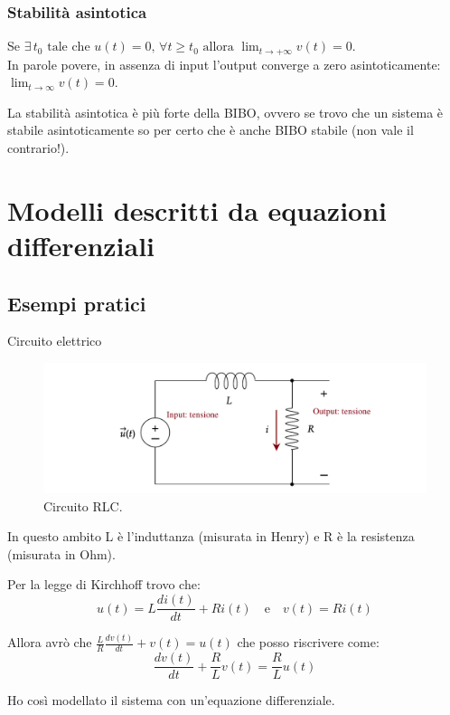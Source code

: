 		\subsubsection{Stabilità asintotica}


			Se $\exists \, t_0 \text{ tale che } u(t)=0 \text{, } \forall t \ge t_0 \text{ allora } \lim_{t \to +\infty} v(t)=0$.\\
			In parole povere, in assenza di input l'output converge a zero asintoticamente: $\lim_{t \to \infty} v(t)=0$.
			
			\begin{NB}				
			La stabilità asintotica è più forte della BIBO, ovvero se trovo che un sistema è stabile asintoticamente so per certo che è anche BIBO stabile (non vale il contrario!).
			\end{NB}

	
\section{Modelli descritti da equazioni differenziali}

\subsection{Esempi pratici}
\begin{nexample}
	Circuito elettrico
	
		\begin{figure}[H]
			\centering
			\includegraphics[scale=0.75]{immagini/cap3_Sistemi/circuito_RLC}
			\caption{ Circuito RLC. }
			\label{fig: circuito_RLC}
		\end{figure}
	 	In questo ambito L è l'induttanza (misurata in Henry) e R è la resistenza (misurata in Ohm). 
 	
	 	Per la legge di Kirchhoff trovo che: 
	 	\[ u(t) = L \frac{di(t)}{dt} + R i(t) \quad \text{e} \quad v(t) = R i(t) \]
	 	
	 	Allora avrò che $ \frac{L}{R} \frac{dv(t)}{dt} + v(t) = u(t)$ che posso riscrivere come:
	 	  \[ \frac{dv(t)}{dt} + \frac{R}{L} v(t) = \frac{R}{L} u(t) \]
	 	  
	 	Ho così modellato il sistema con un'equazione differenziale.
\end{nexample}

